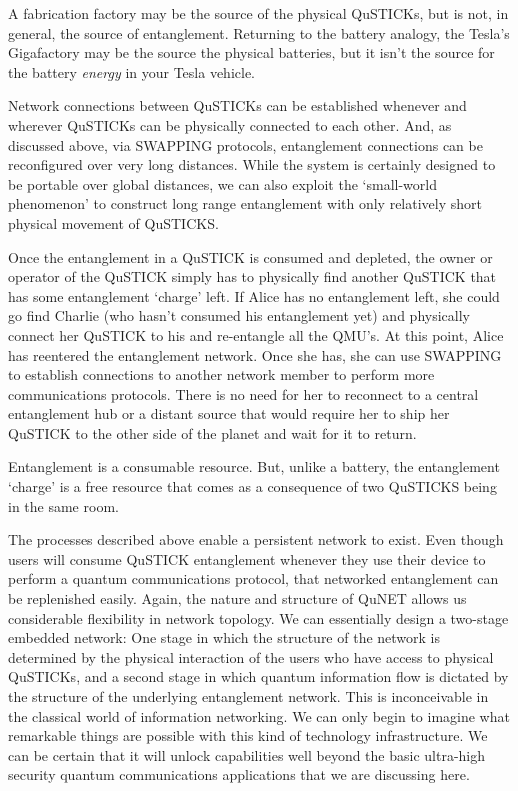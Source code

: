 \documentclass[twocolumn, aps, rmp, amsmath, amssymb, nofootinbib, superscriptaddress, longbibliography, floatfix, table-of-contents, eqsecnum]{revtex4-2}
\begin{document}
A fabrication factory may be the source of the physical QuSTICKs, but is not, in general, the source of entanglement. Returning to the battery analogy, the Tesla's Gigafactory may be the source the physical batteries, but it isn't the source for the battery \textit{energy} in your Tesla vehicle. 

Network connections between QuSTICKs can be established whenever and wherever QuSTICKs can be physically connected to each other. And, as discussed above, via SWAPPING protocols, entanglement connections can be reconfigured over very long distances. While the system is certainly designed to be portable over global distances, we can also exploit the `small-world phenomenon' to construct long range entanglement with only relatively short physical movement of QuSTICKS. 

Once the entanglement in a QuSTICK is consumed and depleted, the owner or operator of the QuSTICK simply has to physically find another QuSTICK that has some entanglement `charge' left. If Alice has no entanglement left, she could go find Charlie (who hasn't consumed his entanglement yet) and physically connect her QuSTICK to his and re-entangle all the QMU's. At this point, Alice has reentered the entanglement network. Once she has, she can use SWAPPING to establish connections to another network member to perform more communications protocols. There is no need for her to reconnect to a central entanglement hub or a distant source that would require her to ship her QuSTICK to the other side of the planet and wait for it to return. 

Entanglement is a consumable resource. But, unlike a battery, the entanglement `charge' is a free resource that comes as a consequence of two QuSTICKS being in the same room. 

The processes described above enable a persistent network to exist. Even though users will consume QuSTICK entanglement whenever they use their device to perform a quantum communications protocol, that networked entanglement can be replenished easily. Again, the nature and structure of QuNET allows us considerable flexibility in network topology. We can essentially design a two-stage embedded network: One stage in which the structure of the network is determined by the physical interaction of the users who have access to physical QuSTICKs, and a second stage in which quantum information flow is dictated by the structure of the underlying entanglement network. This is inconceivable in the classical world of information networking. We can only begin to imagine what remarkable things are possible with this kind of technology infrastructure. We can be certain that it will unlock capabilities well beyond the basic ultra-high security quantum communications applications that we are discussing here. 
\end{document}

